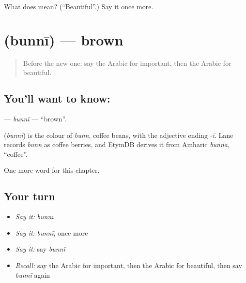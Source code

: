 \begin{tcolorbox}[breakable,colback=teal!4,colframe=teal!35!black,title={Before you move on}]
What does  mean? (\textquotedblleft{}Beautiful\textquotedblright{}.) Say it once more.
\end{tcolorbox}
\section[\texorpdfstring{\ar{بني} (bunnī)}{بني (bunnī)}]{ (bunnī) — brown}

\label{lesson:AR-C86-bunni}



\begin{quote}
Before the new one: say the Arabic for important, then the Arabic for beautiful.
\end{quote}

\subsection*{You'll want to know: }
\textbf{} — \emph{bunnī} — \textquotedblleft{}brown\textquotedblright{}.

\begin{cousinweb}
\textbf{} (\emph{bunnī}) is the colour of \emph{bunn}, coffee beans, with the adjective ending \emph{-ī}. Lane records \emph{bunn} as coffee berries, and EtymDB derives it from Amharic \emph{bunna}, \textquotedblleft{}coffee\textquotedblright{}.
\end{cousinweb}

\begin{grammarlens}[title={What you've built}]
One more word for this chapter.
\end{grammarlens}

\subsection*{Your turn}
\begin{itemize}
\raggedright
  \item \emph{Say it:} \emph{bunnī}
  \item \emph{Say it:} \emph{bunnī}, once more
  \item \emph{Say it:} say \emph{bunnī}
  \item \emph{Recall:} say the Arabic for important, then the Arabic for beautiful, then say \emph{bunnī} again
\end{itemize}

